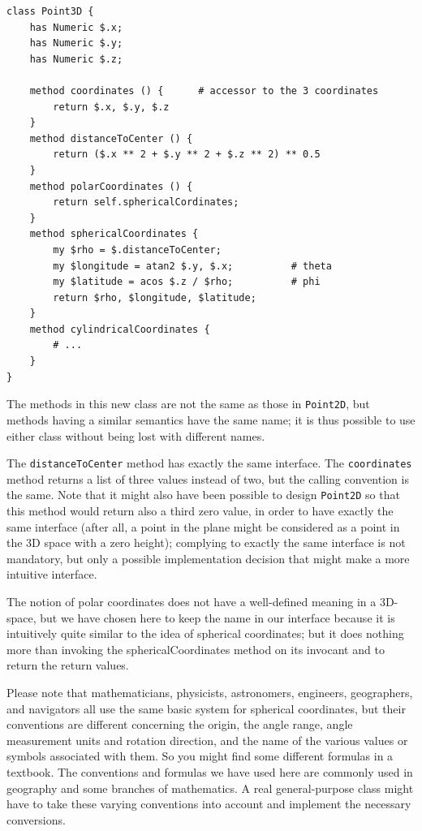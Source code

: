 \begin{verbatim}
class Point3D {
    has Numeric $.x;
    has Numeric $.y;
    has Numeric $.z;
    
    method coordinates () {      # accessor to the 3 coordinates
        return $.x, $.y, $.z
    }
    method distanceToCenter () {
        return ($.x ** 2 + $.y ** 2 + $.z ** 2) ** 0.5
    }
    method polarCoordinates () {
    	return self.sphericalCordinates;
    }
    method sphericalCoordinates {
    	my $rho = $.distanceToCenter;
    	my $longitude = atan2 $.y, $.x;          # theta
    	my $latitude = acos $.z / $rho;          # phi 
    	return $rho, $longitude, $latitude;
    }
    method cylindricalCoordinates {
    	# ...
    }
}
\end{verbatim}

The methods in this new class are not the same as those in 
{\tt Point2D}, but methods having a similar semantics have 
the same name; it is thus possible to use either class 
without being lost with different names. 

The {\tt distanceToCenter} method has exactly the same interface. 
The {\tt coordinates} method returns a list of three values 
instead of two, but the calling convention is the same. Note 
that it might also have been possible to design {\tt Point2D} 
so that this method would return also a third zero value, in order 
to have exactly the same interface (after all, a point in 
the plane might be considered as a point in the 3D space 
with a zero height); complying to exactly the same 
interface is not mandatory, but only a possible implementation 
decision that might make a more intuitive interface. 

The notion of polar coordinates does not have a well-defined 
meaning in a 3D-space, but we have chosen here to keep the name 
in our interface because it is intuitively quite similar to 
the idea of spherical coordinates; but it does nothing more 
than invoking the sphericalCoordinates method on its invocant 
and to return the return values.

Please note that mathematicians, physicists, astronomers, 
engineers, geographers, and navigators all use the same basic system 
for spherical coordinates, but their conventions are different 
concerning the origin, the angle range, angle measurement 
units and rotation direction, and the name of the various 
values or symbols associated with them. So you might find 
some different formulas in a textbook. The conventions and 
formulas we have used here are commonly used in geography and 
some branches of mathematics. A real general-purpose class 
might have to take these varying conventions into account and 
implement the necessary conversions.

